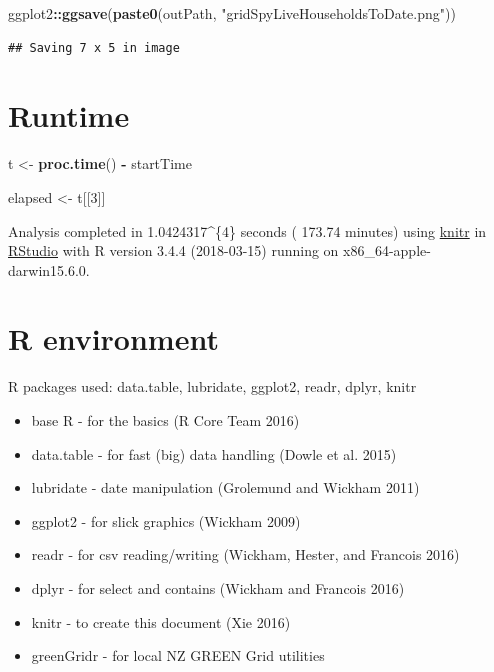 \documentclass[]{article}
\newenvironment{Shaded}{\begin{snugshade}}{\end{snugshade}}
\newcommand{\KeywordTok}[1]{\textcolor[rgb]{0.13,0.29,0.53}{\textbf{#1}}}
\newcommand{\DecValTok}[1]{\textcolor[rgb]{0.00,0.00,0.81}{#1}}
\newcommand{\StringTok}[1]{\textcolor[rgb]{0.31,0.60,0.02}{#1}}
\newcommand{\OperatorTok}[1]{\textcolor[rgb]{0.81,0.36,0.00}{\textbf{#1}}}
\newcommand{\NormalTok}[1]{#1}
\providecommand{\tightlist}{%
  \setlength{\itemsep}{0pt}\setlength{\parskip}{0pt}}
\begin{document}
\begin{Shaded}
\begin{Highlighting}[]
\NormalTok{ggplot2}\OperatorTok{::}\KeywordTok{ggsave}\NormalTok{(}\KeywordTok{paste0}\NormalTok{(outPath, }\StringTok{"gridSpyLiveHouseholdsToDate.png"}\NormalTok{))}
\end{Highlighting}
\end{Shaded}

\begin{verbatim}
## Saving 7 x 5 in image
\end{verbatim}

\section{Runtime}\label{runtime}

\begin{Shaded}
\begin{Highlighting}[]
\NormalTok{t <-}\StringTok{ }\KeywordTok{proc.time}\NormalTok{() }\OperatorTok{-}\StringTok{ }\NormalTok{startTime}

\NormalTok{elapsed <-}\StringTok{ }\NormalTok{t[[}\DecValTok{3}\NormalTok{]]}
\end{Highlighting}
\end{Shaded}

Analysis completed in 1.0424317\^{}\{4\} seconds ( 173.74
minutes) using \href{https://cran.r-project.org/package=knitr}{knitr} in
\href{http://www.rstudio.com}{RStudio} with R version 3.4.4 (2018-03-15)
running on x86\_64-apple-darwin15.6.0.

\section{R environment}\label{r-environment}

R packages used: data.table, lubridate, ggplot2, readr, dplyr, knitr

\begin{itemize}
\tightlist
\item
  base R - for the basics (R Core Team 2016)
\item
  data.table - for fast (big) data handling (Dowle et al. 2015)
\item
  lubridate - date manipulation (Grolemund and Wickham 2011)
\item
  ggplot2 - for slick graphics (Wickham 2009)
\item
  readr - for csv reading/writing (Wickham, Hester, and Francois 2016)
\item
  dplyr - for select and contains (Wickham and Francois 2016)
\item
  knitr - to create this document (Xie 2016)
\item
  greenGridr - for local NZ GREEN Grid utilities
\end{itemize}
\end{document}
